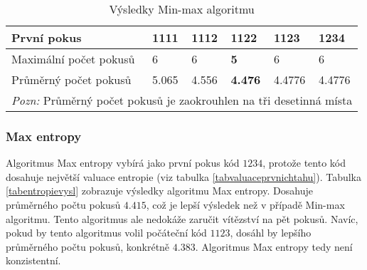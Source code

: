 
\begin{table}[h]
\centering
\begin{tabular}{l l l l l l}
\toprule
První pokus & 1111 & 1112 & \textbf{1122} & 1123 & 1234 \\
\midrule

Maximální počet pokusů 
& 6 & 6 & \textbf{5} & 6 & 6 \\

Průměrný počet pokusů 
& 5.065 & 4.556 & \textbf{4.476} & 4.4776 & 4.4776\\
\bottomrule
\multicolumn{6}{l}{\footnotesize \textit{Pozn:}
Průměrný počet pokusů je zaokrouhlen na tři desetinná místa}
\end{tabular}
\caption{Výsledky Min-max algoritmu}\label{tabminmaxvysl}
\end{table}

\subsubsection{Max entropy}
Algoritmus Max entropy vybírá jako první pokus kód $1234$, protože tento kód dosahuje největší valuace entropie (viz tabulka \ref{tabvaluaceprvnichtahu}). Tabulka \ref{tabentropievysl} zobrazuje výsledky algoritmu Max entropy. Dosahuje průměrného počtu pokusů $4.415$, což je lepší výsledek než v případě Min-max algoritmu. Tento algoritmus ale nedokáže zaručit vítězství na pět pokusů. Navíc, pokud by tento algoritmus volil počáteční kód $1123$, dosáhl by lepšího průměrného počtu pokusů, konkrétně $4.383$. Algoritmus Max entropy tedy není konzistentní. 


